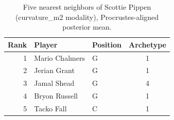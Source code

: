 \begin{table}[htbp]
  \centering\small
  \begin{tabular}{rllc}
    \toprule
    Rank & Player & Position & Archetype \\
    \midrule
    1 & Mario Chalmers & G & 1 \\
    2 & Jerian Grant & G & 1 \\
    3 & Jamal Shead & G & 4 \\
    4 & Bryon Russell & G & 1 \\
    5 & Tacko Fall & C & 1 \\
    \bottomrule
  \end{tabular}
  \caption{Five nearest neighbors of Scottie Pippen (curvature_m2 modality), Procrustes-aligned posterior mean.}
  \label{tab:Scottie_Pippen_neighbors_curvature_m2}
\end{table}

